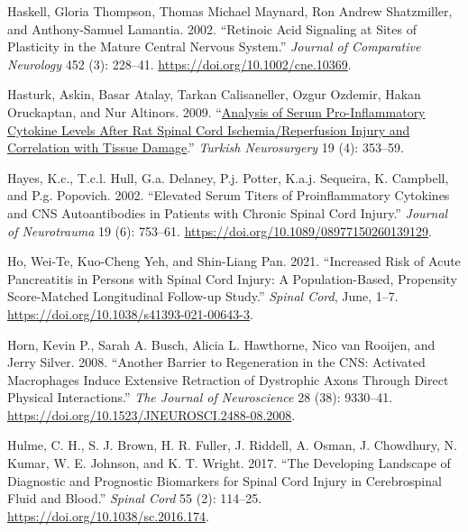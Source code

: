 \documentclass[9pt,lineno]{elife}
\newlength{\cslhangindent}
\newlength{\cslentryspacingunit} %
\newenvironment{CSLReferences}[2] %
 {%
  \setlength{\parindent}{0pt}
  \ifodd #1
  \let\oldpar\par
  \def\par{\hangindent=\cslhangindent\oldpar}
  \fi
  \setlength{\parskip}{#2\cslentryspacingunit}
 }%
 {}
\begin{document}
\begin{landscape}
\begin{landscape}
\begin{landscape}
\begin{landscape}
\begin{CSLReferences}{1}{0}
\leavevmode{}%
Haskell, Gloria Thompson, Thomas Michael Maynard, Ron Andrew Shatzmiller, and Anthony-Samuel Lamantia. 2002. {``Retinoic Acid Signaling at Sites of Plasticity in the Mature Central Nervous System.''} \emph{Journal of Comparative Neurology} 452 (3): 228--41. \url{https://doi.org/10.1002/cne.10369}.

\leavevmode{}%
Hasturk, Askin, Basar Atalay, Tarkan Calisaneller, Ozgur Ozdemir, Hakan Oruckaptan, and Nur Altinors. 2009. {``\href{https://www.ncbi.nlm.nih.gov/pubmed/19847755}{Analysis of Serum Pro-Inflammatory Cytokine Levels After Rat Spinal Cord Ischemia/Reperfusion Injury and Correlation with Tissue Damage}.''} \emph{Turkish Neurosurgery} 19 (4): 353--59.

\leavevmode{}%
Hayes, K.c., T.c.l. Hull, G.a. Delaney, P.j. Potter, K.a.j. Sequeira, K. Campbell, and P.g. Popovich. 2002. {``Elevated {Serum Titers} of {Proinflammatory Cytokines} and {CNS Autoantibodies} in {Patients} with {Chronic Spinal Cord Injury}.''} \emph{Journal of Neurotrauma} 19 (6): 753--61. \url{https://doi.org/10.1089/08977150260139129}.

\leavevmode{}%
Ho, Wei-Te, Kuo-Cheng Yeh, and Shin-Liang Pan. 2021. {``Increased Risk of Acute Pancreatitis in Persons with Spinal Cord Injury: A Population-Based, Propensity Score-Matched Longitudinal Follow-up Study.''} \emph{Spinal Cord}, June, 1--7. \url{https://doi.org/10.1038/s41393-021-00643-3}.

\leavevmode{}%
Horn, Kevin P., Sarah A. Busch, Alicia L. Hawthorne, Nico van Rooijen, and Jerry Silver. 2008. {``Another {Barrier} to {Regeneration} in the {CNS}: {Activated Macrophages Induce Extensive Retraction} of {Dystrophic Axons} Through {Direct Physical Interactions}.''} \emph{The Journal of Neuroscience} 28 (38): 9330--41. \url{https://doi.org/10.1523/JNEUROSCI.2488-08.2008}.

\leavevmode{}%
Hulme, C. H., S. J. Brown, H. R. Fuller, J. Riddell, A. Osman, J. Chowdhury, N. Kumar, W. E. Johnson, and K. T. Wright. 2017. {``The Developing Landscape of Diagnostic and Prognostic Biomarkers for Spinal Cord Injury in Cerebrospinal Fluid and Blood.''} \emph{Spinal Cord} 55 (2): 114--25. \url{https://doi.org/10.1038/sc.2016.174}.


\end{CSLReferences}
\end{landscape}
\end{landscape}
\end{landscape}
\end{landscape}
\end{document}
